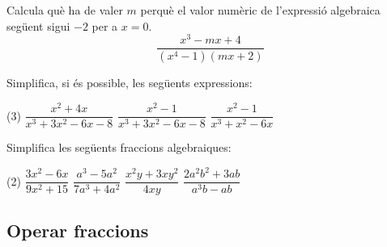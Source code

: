 \begin{mylist}
	
	
	\exer  Calcula què ha de valer $m$ perquè el valor numèric de l'expressió algebraica següent sigui $-2$ per a  $x = 0$.
	\[\dfrac{x^{3} -mx+4}{(x^{4} -1)(mx+2)} \] 
 
		\exer  Simplifica, si és possible, les següents expressions: 
 \begin{tasks}(3)
	\task $\dfrac{x^{2} +4x}{x^{3} +3x^{2} -6x-8} $  
	\task $\dfrac{x^{2} -1}{x^{3} +3x^{2} -6x-8} $   
	\task $\dfrac{x^{2} -1}{x^{3} +x^{2} -6x} $ 
\end{tasks}	
 
\exer  Simplifica les següents fraccions algebraiques:
\begin{tasks}(2)	
\task $\dfrac{3x^{2} -6x}{9x^{2} +15} $ 
\task $\dfrac{a^{3} -5a^{2} }{7a^{3} +4a^{2} } $ 
 \task $\dfrac{x^{2} y+3xy^{2} }{4xy} $  
 \task$\dfrac{2a^{2} b^{2} +3ab}{a^{3} b-ab} $
\end{tasks}
  
\end{mylist}
 
\subsection{Operar fraccions}

